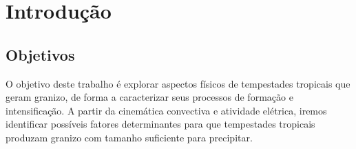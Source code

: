 \chapter{Introdução}

\section{Objetivos}

O objetivo deste trabalho é explorar aspectos físicos de tempestades tropicais que geram granizo, de forma a caracterizar seus processos de formação e intensificação. A partir da cinemática convectiva e atividade elétrica, iremos identificar possíveis fatores determinantes para que tempestades tropicais produzam granizo com tamanho suficiente para precipitar.